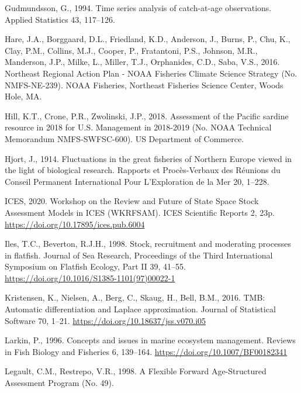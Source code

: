 \documentclass[]{article}
\begin{document}
\leavevmode\hypertarget{ref-gudmundsson1994Time}{}%
Gudmundsson, G., 1994. Time series analysis of catch-at-age
observations. Applied Statistics 43, 117--126.

\leavevmode\hypertarget{ref-hare2016Northeast}{}%
Hare, J.A., Borggaard, D.L., Friedland, K.D., Anderson, J., Burns, P.,
Chu, K., Clay, P.M., Collins, M.J., Cooper, P., Fratantoni, P.S.,
Johnson, M.R., Manderson, J.P., Milke, L., Miller, T.J., Orphanides,
C.D., Saba, V.S., 2016. Northeast Regional Action Plan - NOAA Fisheries
Climate Science Strategy (No. NMFS-NE-239). NOAA Fisheries, Northeast
Fisheries Science Center, Woods Hole, MA.

\leavevmode\hypertarget{ref-hill2018Assessment}{}%
Hill, K.T., Crone, P.R., Zwolinski, J.P., 2018. Assessment of the
Pacific sardine resource in 2018 for U.S. Management in 2018-2019 (No.
NOAA Technical Memorandum NMFS-SWFSC-600). US Department of Commerce.

\leavevmode\hypertarget{ref-hjort1914Fluctuations}{}%
Hjort, J., 1914. Fluctuations in the great fisheries of Northern Europe
viewed in the light of biological research. Rapports et Procès-Verbaux
des Réunions du Conseil Permanent International Pour L'Exploration de la
Mer 20, 1--228.

\leavevmode\hypertarget{ref-ices2020Workshop}{}%
ICES, 2020. Workshop on the Review and Future of State Space Stock
Assessment Models in ICES (WKRFSAM). ICES Scientific Reports 2, 23p.
\url{https://doi.org/10.17895/ices.pub.6004}

\leavevmode\hypertarget{ref-iles1998Stock}{}%
Iles, T.C., Beverton, R.J.H., 1998. Stock, recruitment and moderating
processes in flatfish. Journal of Sea Research, Proceedings of the Third
International Symposium on Flatfish Ecology, Part II 39, 41--55.
\url{https://doi.org/10.1016/S1385-1101(97)00022-1}

\leavevmode\hypertarget{ref-kristensen2016TMB}{}%
Kristensen, K., Nielsen, A., Berg, C., Skaug, H., Bell, B.M., 2016. TMB:
Automatic differentiation and Laplace approximation. Journal of
Statistical Software 70, 1--21.
\url{https://doi.org/10.18637/jss.v070.i05}

\leavevmode\hypertarget{ref-larkin1996Concepts}{}%
Larkin, P., 1996. Concepts and issues in marine ecosystem management.
Reviews in Fish Biology and Fisheries 6, 139--164.
\url{https://doi.org/10.1007/BF00182341}

\leavevmode\hypertarget{ref-legault1998Flexible}{}%
Legault, C.M., Restrepo, V.R., 1998. A Flexible Forward Age-Structured
Assessment Program (No. 49).
\end{document}

